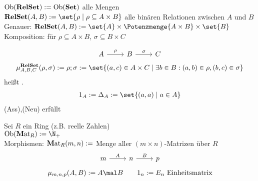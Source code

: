\begin{beispiel}[$\RelSet$]\label{beisp1.6RelSet}\enter
	$\operatorname{Ob}(\operatorname{\mathbf{RelSet}}):=\operatorname{Ob}(\operatorname{\mathbf{Set}})$ alle Mengen\\
	$\RelSet(A,B):=\set{\rho\mid\rho\subseteq A\times B}$ alle binären Relationen zwischen $A$ und $B$\\
	Genauer: $\RelSet(A,B):=\set{A}\times\Potenzmenge{A\times B}\times\set{B}$\\
	Komposition: für $\rho\subseteq A\times B$, $\sigma\subseteq B\times C$

	$$
	\begin{tikzcd}[ampersand replacement=\&]
		A \arrow{r}{\rho} \& B \arrow{r}{\sigma} \& C
  	\end{tikzcd}
	$$
	\begin{align*}
		\mu_{A,B,C}^{\RelSet}(\rho,\sigma):=\rho;\sigma
		:=\set{(a,c)\in A\times C\mid\exists b\in B:(a,b)\in\rho,(b,c)\in\sigma}
	\end{align*}
	heißt .
	\begin{align*}
		1_A:=\Delta_A:=\set{(a,a)\mid a\in A}
	\end{align*}
	(Ass),(Neu) erfüllt
\end{beispiel}

\begin{beispiel}\label{beisp1.7Mat}\enter
	Sei $R$ ein Ring (z.B. reelle Zahlen)\\
	$\Ob(\Mat_R):=\N_+$\\
	Morphismen:
	$\operatorname{\mathbf Mat}_R(m,n):=$ Menge aller $(m\times n)$-Matrizen über $R$
	$$
	\begin{tikzcd}[ampersand replacement=\&]
		m \arrow{r}{A} \& n \arrow{r}{B} \& p
  	\end{tikzcd}
	$$
	\begin{align*}
		\mu_{m,n,p}(A,B):=A\mal B\qquad 1_n:=E_n\text{ Einheitsmatrix}
	\end{align*}
\end{beispiel}


